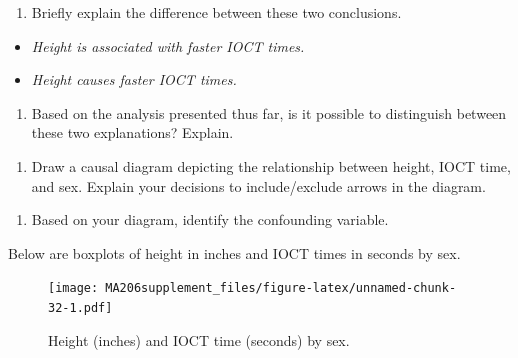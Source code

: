 \documentclass[
]{book}
\providecommand{\tightlist}{%
  \setlength{\itemsep}{0pt}\setlength{\parskip}{0pt}}
\begin{document}
\vspace{1in}

\begin{enumerate}
\def\labelenumi{\arabic{enumi}.}
\setcounter{enumi}{8}
\tightlist
\item
  Briefly explain the difference between these two conclusions.
\end{enumerate}

\begin{itemize}
\item
  \emph{Height is associated with faster IOCT times.}
\item
  \emph{Height causes faster IOCT times.}
\end{itemize}

\vspace{1in}

\begin{enumerate}
\def\labelenumi{\arabic{enumi}.}
\setcounter{enumi}{9}
\tightlist
\item
  Based on the analysis presented thus far, is it possible to distinguish between these two explanations? Explain.
\end{enumerate}

\vspace{1in}

\begin{enumerate}
\def\labelenumi{\arabic{enumi}.}
\setcounter{enumi}{10}
\tightlist
\item
  Draw a causal diagram depicting the relationship between height, IOCT time, and sex. Explain your decisions to include/exclude arrows in the diagram.
\end{enumerate}

\vspace{1in}

\begin{enumerate}
\def\labelenumi{\arabic{enumi}.}
\setcounter{enumi}{11}
\tightlist
\item
  Based on your diagram, identify the confounding variable.
\end{enumerate}

\vspace{0.5in}

Below are boxplots of height in inches and IOCT times in seconds by sex.

\begin{figure}
\centering
\texttt{[image: MA206supplement\_files/figure-latex/unnamed-chunk-32-1.pdf]}
\caption{\label{fig:unnamed-chunk-32}Height (inches) and IOCT time (seconds) by sex.}
\end{figure}
\end{document}
